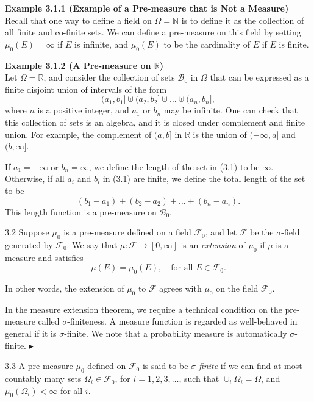 \textbf{Example 3.1.1 (Example of a Pre-measure that is Not a Measure)} \\
Recall that one way to define a field on $\Omega = \mathbb{N}$ is to define it as the collection of all finite and co-finite sets. We can define a pre-measure on this field by setting $\mu_0(E) = \infty$ if $E$ is infinite, and $\mu_0(E)$ to be the cardinality of $E$ if $E$ is finite.

\textbf{Example 3.1.2 (A Pre-measure on $\mathbb{R}$)} \\
Let $\Omega = \mathbb{R}$, and consider the collection of sets $\mathcal{B}_0$ in $\Omega$ that can be expressed as a finite disjoint union of intervals of the form
\begin{equation}
(a_1, b_1] \uplus (a_2, b_2] \uplus \dots \uplus (a_n, b_n], \tag{3.1}
\end{equation}
where $n$ is a positive integer, and $a_1$ or $b_n$ may be infinite. One can check that this collection of sets is an algebra, and it is closed under complement and finite union. For example, the complement of $(a, b]$ in $\mathbb{R}$ is the union of $(-\infty, a]$ and $(b, \infty]$.

If $a_1 = -\infty$ or $b_n = \infty$, we define the length of the set in (3.1) to be $\infty$. Otherwise, if all $a_i$ and $b_i$ in (3.1) are finite, we define the total length of the set to be
\[
(b_1 - a_1) + (b_2 - a_2) + \dots + (b_n - a_n).
\]
This length function is a pre-measure on $\mathcal{B}_0$.

\begin{defbox}{3.2}
Suppose $\mu_0$ is a pre-measure defined on a field $\mathcal{F}_0$, and let $\mathcal{F}$ be the $\sigma$-field generated by $\mathcal{F}_0$. We say that $\mu : \mathcal{F} \to [0, \infty]$ is an \textit{extension} of $\mu_0$ if $\mu$ is a measure and satisfies
\[
\mu(E) = \mu_0(E), \quad \text{for all } E \in \mathcal{F}_0.
\]
\end{defbox}
In other words, the extension of $\mu_0$ to $\mathcal{F}$ agrees with $\mu_0$ on the field $\mathcal{F}_0$.

In the measure extension theorem, we require a technical condition on the pre-measure called $\sigma$-finiteness. A measure function is regarded as well-behaved in general if it is $\sigma$-finite. We note that a probability measure is automatically $\sigma$-finite.
\noindent$\blacktriangleright$ 

\begin{defbox}{3.3}
A pre-measure $\mu_0$ defined on $\mathcal{F}_0$ is said to be \textit{$\sigma$-finite} if we can find at most countably many sets $\Omega_i \in \mathcal{F}_0$, for $i = 1, 2, 3, \dots$, such that $\cup_i \Omega_i = \Omega$, and $\mu_0(\Omega_i) < \infty$ for all $i$.
\end{defbox}

